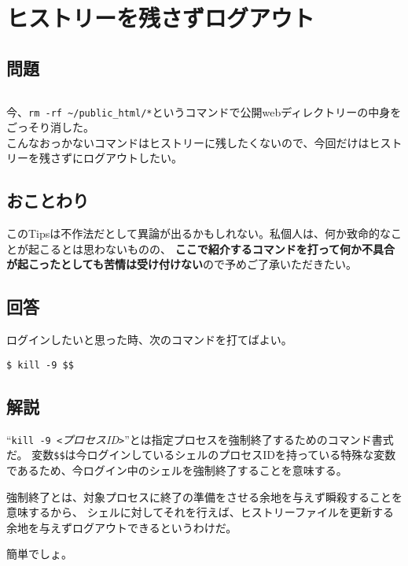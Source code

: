 \section{ヒストリーを残さずログアウト}

\subsection*{問題}
\noindent
$\!\!\!\!\!$
\begin{grshfboxit}{160.0mm}
	今、\verb|rm -rf ~/public_html/*|というコマンドで公開webディレクトリーの中身をごっそり消した。 \\
	こんなおっかないコマンドはヒストリーに残したくないので、今回だけはヒストリーを残さずにログアウトしたい。
\end{grshfboxit}

\subsection*{おことわり}

このTipsは不作法だとして異論が出るかもしれない。私個人は、何か致命的なことが起こるとは思わないものの、
\textbf{ここで紹介するコマンドを打って何か不具合が起こったとしても苦情は受け付けない}ので予めご了承いただきたい。

\subsection*{回答}

ログインしたいと思った時、次のコマンドを打てばよい。

\begin{screen}
	\verb|$ kill -9 $$| \return
\end{screen}

\subsection*{解説}

``\verb|kill -9 <|\textit{プロセスID}\verb|>|''とは指定プロセスを強制終了するためのコマンド書式だ。
変数\verb|$$|は今ログインしているシェルのプロセスIDを持っている特殊な変数であるため、今ログイン中のシェルを強制終了することを意味する。

強制終了とは、対象プロセスに終了の準備をさせる余地を与えず瞬殺することを意味するから、
シェルに対してそれを行えば、ヒストリーファイルを更新する余地を与えずログアウトできるというわけだ。

簡単でしょ。
